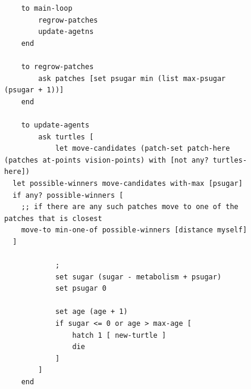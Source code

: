 \documentclass[preprint,5p,times,twocolumn,authoryear]{elsarticle}
\begin{document}
\begin{figure}
\begin{lstlisting}
	to main-loop
    	regrow-patches
        update-agetns
    end
    
    to regrow-patches
    	ask patches [set psugar min (list max-psugar (psugar + 1))]
    end
    
    to update-agents
    	ask turtles [
    		let move-candidates (patch-set patch-here (patches at-points vision-points) with [not any? turtles-here])
  let possible-winners move-candidates with-max [psugar]
  if any? possible-winners [
    ;; if there are any such patches move to one of the patches that is closest
    move-to min-one-of possible-winners [distance myself]
  ]
            
            ; 
            set sugar (sugar - metabolism + psugar)
  			set psugar 0
            
    		set age (age + 1)
    		if sugar <= 0 or age > max-age [
      			hatch 1 [ new-turtle ]
      			die
    		]
  		]
    end
    
\end{lstlisting}
\end{figure}



\begin{figure}
	\begin{lstlisting}
    
    \end{lstlisting}
\end{figure}
\end{document}

